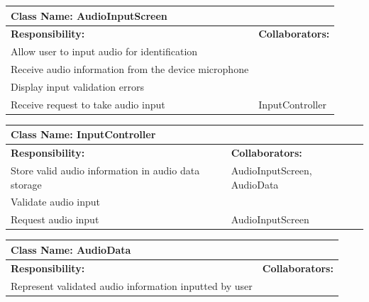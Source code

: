\documentclass[]{article}
\begin{document}
	
	\begin{table}[ht]
		\centering
		\begin{tabular}{|p{5cm}|p{5cm}|}
		\hline 
		 \multicolumn{2}{|l|}{\textbf{Class Name: AudioInputScreen}} \\
		\hline
		\textbf{Responsibility:} & \textbf{Collaborators:} \\
		\hline
		Allow user to input audio for identification &  \\
		\hline
		Receive audio information from the device microphone &  \\
		\hline
		Display input validation errors &  \\
		\hline
		Receive request to take audio input & InputController \\
		\hline
		\end{tabular}
	\end{table}
	
	\begin{table}[ht]
		\centering
		\begin{tabular}{|p{5cm}|p{5cm}|}
		\hline 
		 \multicolumn{2}{|l|}{\textbf{Class Name: InputController}} \\
		\hline
		\textbf{Responsibility:} & \textbf{Collaborators:} \\
		\hline
		Store valid audio information in audio data storage & AudioInputScreen, \mbox{AudioData} \\
		\hline
		Validate audio input &  \\
		\hline
		Request audio input & AudioInputScreen \\
		\hline
		\end{tabular}
	\end{table}
	
	\begin{table}[ht]
		\centering
		\begin{tabular}{|p{5cm}|p{5cm}|}
		\hline 
		 \multicolumn{2}{|l|}{\textbf{Class Name: AudioData}} \\
		\hline
		\textbf{Responsibility:} & \textbf{Collaborators:} \\
		\hline
		Represent validated audio information inputted by user & \\
		\hline
		\end{tabular}
	\end{table}
	
\end{document}
